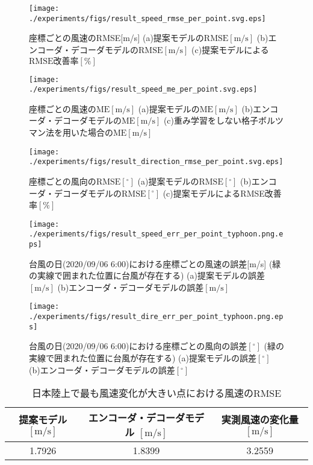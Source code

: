 \begin{figure}[bp]
  \centering
  \texttt{[image: ./experiments/figs/result\_speed\_rmse\_per\_point.svg.eps]}
  \caption{座標ごとの風速のRMSE[m/s] (a)提案モデルの$\mathrm{RMSE[m/s]}$ (b)エンコーダ・デコーダモデルの$\mathrm{RMSE[m/s]}$ (c)提案モデルによる$\mathrm{RMSE改善率[\%]}$}
  \label{fig:exp-speed-rmse-per-point}
\end{figure}

\begin{figure}[bp]
  \centering
  \texttt{[image: ./experiments/figs/result\_speed\_me\_per\_point.svg.eps]}
  \caption{座標ごとの風速の$\mathrm{ME[m/s]}$ (a)提案モデルの$\mathrm{ME[m/s]}$ (b)エンコーダ・デコーダモデルの$\mathrm{ME[m/s]}$ (c)重み学習をしない格子ボルツマン法を用いた場合の$\mathrm{ME[m/s]}$}
  \label{fig:exp-speed-ma-per-point}
\end{figure}

\begin{figure}[bp]
  \centering
  \texttt{[image: ./experiments/figs/result\_direction\_rmse\_per\_point.svg.eps]}
  \caption{座標ごとの風向の$\mathrm{RMSE[^\circ]}$ (a)提案モデルの$\mathrm{RMSE[^\circ]}$ (b)エンコーダ・デコーダモデルの$\mathrm{RMSE[^\circ]}$ (c)提案モデルによるRMSE改善率$\mathrm{[\%]}$}
  \label{fig:exp-direction-rmse-per-point}
\end{figure}

\begin{figure}[bp]
  \centering
  \texttt{[image: ./experiments/figs/result\_speed\_err\_per\_point\_typhoon.png.eps]}
  \caption{台風の日(2020/09/06 6:00)における座標ごとの風速の誤差[m/s] (緑の実線で囲まれた位置に台風が存在する) (a)提案モデルの誤差$\mathrm{[m/s]}$ (b)エンコーダ・デコーダモデルの誤差$\mathrm{[m/s]}$}
  \label{fig:exp-speed-err-per-point-typhoon}
\end{figure}

\begin{figure}[bp]
  \centering
  \texttt{[image: ./experiments/figs/result\_dire\_err\_per\_point\_typhoon.png.eps]}
  \caption{台風の日(2020/09/06 6:00)における座標ごとの風向の誤差$\mathrm{[^\circ]}$ (緑の実線で囲まれた位置に台風が存在する) (a)提案モデルの誤差$\mathrm{[^\circ]}$ (b)エンコーダ・デコーダモデルの誤差$\mathrm{[^\circ]}$}
  \label{fig:exp-direction-err-per-point-typhoon}
\end{figure}

\begin{table}[bp]
  \caption{日本陸上で最も風速変化が大きい点における風速のRMSE}
  \label{table:exp-max-diff-point-speed}
  \centering
  \begin{tabular}{ccc}
    \hline
    提案モデル $\mathrm{[m/s]}$ & エンコーダ・デコーダモデル $\mathrm{[m/s]}$ & 実測風速の変化量 $\mathrm{[m/s]}$ \\
    \hline
    1.7926 & 1.8399 & 3.2559 \\
    \hline
  \end{tabular}
\end{table}

